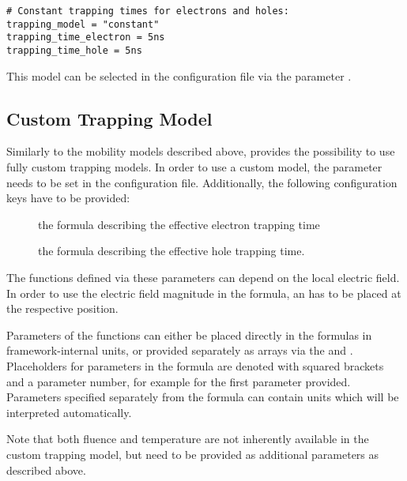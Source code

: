 \begin{verbatim}
# Constant trapping times for electrons and holes:
trapping_model = "constant"
trapping_time_electron = 5ns
trapping_time_hole = 5ns
\end{verbatim}

This model can be selected in the configuration file via the parameter .


\subsection{Custom Trapping Model}

Similarly to the mobility models described above, \apsq provides the possibility to use fully custom trapping models.
In order to use a custom model, the parameter  needs to be set in the configuration file.
Additionally, the following configuration keys have to be provided:
\begin{description}
    \item[] the formula describing the effective electron trapping time
    \item[] the formula describing the effective hole trapping time.
\end{description}

The functions defined via these parameters can depend on the local electric field.
In order to use the electric field magnitude in the formula, an  has to be placed at the respective position.

Parameters of the functions can either be placed directly in the formulas in framework-internal units, or provided separately as arrays via the  and .
Placeholders for parameters in the formula are denoted with squared brackets and a parameter number, for example \parameter{[0]} for the first parameter provided.
Parameters specified separately from the formula can contain units which will be interpreted automatically.

\begin{warning}
Note that both fluence and temperature are not inherently available in the custom trapping model, but need to be provided as additional parameters as described above.
\end{warning}

